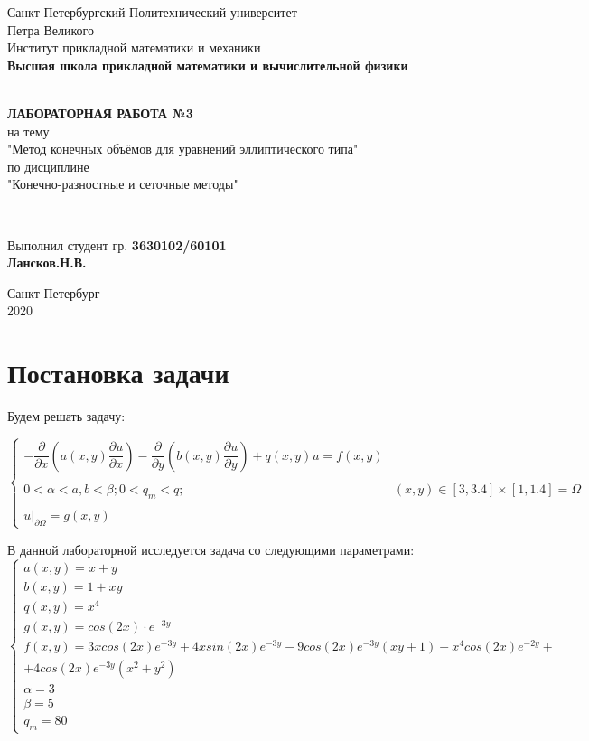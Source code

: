 \documentclass[12pt]{article}
\renewcommand{\listoffigures}{\begingroup  %
\tocsection
\tocfile{\listfigurename}{lof}
\endgroup}
\renewcommand{\listoftables}{\begingroup  %
\tocsection
\tocfile{\listtablename}{lot}
\endgroup}
\begin{document}
\begin{titlepage}
	\center
		Санкт-Петербургский Политехнический 
		университет \\ Петра Великого\\
		Институт прикладной математики и механики
		\\ \textbf{Высшая школа прикладной математики и вычислительной физики}

	\vfill ~
	\textbf{
		\\ \large ЛАБОРАТОРНАЯ РАБОТА №3
	}
	\\	на тему 
	\\ "Метод конечных объёмов для уравнений эллиптического типа"
	\\ по дисциплине
	\\ "Конечно-разностные и сеточные методы"

	\vfill ~

	Выполнил студент гр. \textbf{3630102/60101} \\
	\textbf{Лансков.Н.В.} \\ 

\vfill

{\large}	Санкт-Петербург
\\ 2020
\end{titlepage}


\tableofcontents 
\newpage
\listoffigures
\newpage
\listoftables
\newpage

\section{Постановка задачи}

Будем решать задачу:

$$
\begin{cases}
-\dfrac{\partial}{\partial x}\left( a(x,y) \dfrac{\partial u}{\partial x}\right) - \dfrac{\partial}{\partial y}\left( b(x,y) \dfrac{\partial u}{\partial y}\right) + q(x,y)u = f(x,y)
\\ \\
0 < \alpha < a, b < \beta; 0 < q_m < q; & (x,y) \in [3, 3.4] \times [1, 1.4] = \Omega
\\ \\
u|_{\partial \Omega} = g(x, y)
\end{cases}
$$

В данной лабораторной исследуется задача со следующими параметрами:
$$
\begin{cases}
a(x,y) = x + y \\ 
b(x,y) = 1 + xy \\
q(x,y) = x^4 \\
g(x,y) = cos(2x) \cdot e^{-3y} \\
f(x,y) = 3xcos(2x)e^{-3y}+4xsin(2x)e^{-3y} - 9cos(2x)e^{-3y}(xy + 1) + x^4cos(2x)e^{-2y} + \\ + 4cos(2x)e^{-3y}(x^2 + y^2) \\
\alpha = 3 \\
\beta = 5 \\
q_m = 80
\end{cases}
$$
\end{document}
